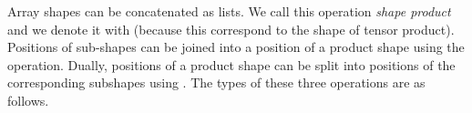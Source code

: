 Array shapes can be concatenated as lists.  We call this operation
\emph{shape product} and we denote it with  (because this
correspond to the shape of tensor product).  Positions of sub-shapes
can be joined into a position of a product shape using the 
operation.  Dually, positions of a product shape can be split into
positions of the corresponding subshapes using .  The types
of these three operations are as follows.
